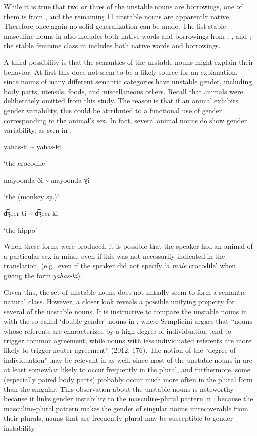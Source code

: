 \documentclass[output=paper,modfonts]{langscibook}
\begin{document}
While it is true that two or three of the unstable nouns are  borrowings, one of them is from , and the remaining 11 unstable nouns are apparently native. Therefore once again no solid generalization can be made. The list stable masculine nouns in  also includes both native words and borrowings from , , and ; the stable feminine class in  includes both native words and  borrowings.

A third possibility is that the semantics of the unstable nouns might explain their behavior. At first this does not seem to be a likely source for an explanation, since nouns of many different semantic categories have unstable gender, including body parts, utensils, foods, and miscellaneous others. Recall that animals were deliberately omitted from this study. The reason is that if an animal  exhibits gender variability, this could be attributed to a functional use of gender corresponding to the animal’s sex. In fact, several animal nouns do show gender variability, as seen in .

\ea%
\label{ex:paster:14}
\parbox{5cm}{yahas-ti {\textasciitilde} yahas-ki}    ‘the crocodile’ \\ 
\parbox{5cm}{mayoonda-ði {\textasciitilde} mayoonda-ɣi}  ‘the (monkey sp.)’\\
\parbox{5cm}{d͡ʒeer-ti {\textasciitilde} d͡ʒeer-ki}   ‘the hippo’
\z

When these forms were produced, it is possible that the speaker had an animal of a particular sex in mind, even if this was not necessarily indicated in the  translation, (e.g., even if the speaker did not specify ‘a \textit{male} crocodile’ when giving the form \textit{yahas-ki}).

Given this, the set of unstable nouns does not initially seem to form a semantic natural class. However, a closer look reveals a possible unifying property for several of the unstable nouns. It is instructive to compare the unstable nouns in  with the so-called ‘double gender’ nouns in , where Semplicini argues that “nouns whose referents are characterized by a high degree of individuation tend to trigger common agreement, while nouns with less individuated referents are more likely to trigger neuter agreement” (2012: 176). The notion of the “degree of individuation” may be relevant in  as well, since most of the unstable nouns in  are at least somewhat likely to occur frequently in the plural, and furthermore, some (especially paired body parts) probably occur much more often in the plural form than the singular. This observation about the unstable nouns is noteworthy because it links gender instability to the masculine-plural pattern in : because the masculine-plural pattern makes the gender of singular nouns unrecoverable from their plurals, nouns that are frequently plural may be susceptible to gender instability. 
\end{document}
